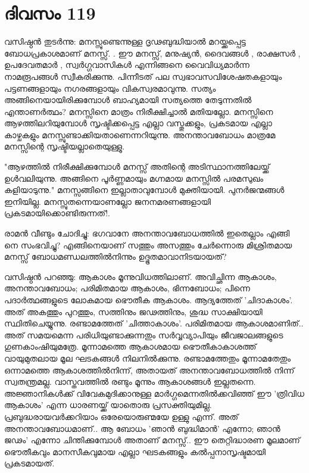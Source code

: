  
\section{ദിവസം 119}


വസിഷ്ഠന്‍ തുടര്‍ന്നു: മനസ്സുണ്ടെന്നുള്ള ദൃഢബുദ്ധിയാല്‍ മറയ്ക്കപ്പെട്ട ബോധപ്രകാശമാണ്‌ മനസ്സ്‌. . ഈ മനസ്സ്‌, മനുഷ്യന്‍, ദൈവങ്ങള്‍ , രാക്ഷസര്‍ , ഉപദേവതമാര്‍ , സ്വര്‍ഗ്ഗവാസികള്‍ എന്നിങ്ങനെ വൈവിധ്യമാര്‍ന്ന നാമരൂപങ്ങള്‍ സ്വീകരിക്കുന്നു. പിന്നീടത്‌ പല സ്വഭാവസവിശേഷതകളായും പട്ടണങ്ങളായും നഗരങ്ങളായും വികസ്വരമാവുന്നു. സത്യം അങ്ങിനെയായിരിക്കുമ്പോള്‍ ബാഹ്യമായി സത്യത്തെ തേടുന്നതില്‍ എന്താണര്‍ത്ഥം? മനസ്സിനെ മാത്രം നിരീക്ഷിച്ചാല്‍ മതിയല്ലോ. മനസ്സിനെ ആഴത്തിലറിയുമ്പോള്‍ സൃഷ്ടിക്കപ്പെട്ട എല്ലാ വസ്തുക്കളും, പ്രകടമായ എല്ലാ കാഴ്ചകളും മനസ്സുണ്ടാക്കിയതാണെന്നറിയുന്നു. അനന്താവബോധം മാത്രമേ മനസ്സിന്റെ സൃഷ്ടിയല്ലാതെയുള്ളു.

"ആഴത്തില്‍ നിരീക്ഷിക്കുമ്പോള്‍ മനസ്സ്‌ അതിന്റെ അടിസ്ഥാനത്തിലേയ്ക്ക്‌ ഉള്‍വലിയുന്നു. അങ്ങിനെ പൂര്‍ണ്ണമായും മഗ്നമായ മനസ്സില്‍ പരമസുഖം കളിയാടുന്നു." മനസ്സങ്ങിനെ ഇല്ലാതാവുമ്പോള്‍ മുക്തിയായി. പുനര്‍ജന്മങ്ങള്‍ ഇനിയില്ല. മനസ്സുതന്നെയാണല്ലോ ജനനമരണങ്ങളായി പ്രകടമായിക്കൊണ്ടിരുന്നത്‌!.

രാമന്‍ വീണ്ടും ചോദിച്ചു: ഭഗവാനേ അനന്താവബോധത്തില്‍ ഇതെല്ലാം എങ്ങി നെ സംഭവിച്ചു? എങ്ങിനെയാണ്‌ സത്തും അസത്തും ചേര്‍ന്നൊരു മിശ്രിതമായ മനസ്സ്‌ ബോധമണ്ഡലത്തില്‍നിന്നും ഉദ്ഭൂതമാവാനിടയായത്‌?

വസിഷ്ഠന്‍ പറഞ്ഞു: ആകാശം മൂന്നുവിധത്തിലാണ്‌. അവിച്ഛിന്ന ആകാശം, അനന്താവബോധം; പരിമിതമായ ആകാശം, ഭിന്നബോധം; പിന്നെ പദാര്‍ത്ഥങ്ങളുടെ ലോകമായ ഭൌതീക ആകാശം. ആദ്യത്തേത്‌ 'ചിദാകാശം'. അത്‌ അകത്തും പുറത്തും, സത്തിനും ജഢത്തിനും, ശുദ്ധ സാക്ഷിയായി സ്ഥിതിചെയ്യുന്നു. രണ്ടാമത്തേത്‌ 'ചിത്താകാശം'. പരിമിതമായ ആകാശമാണിത്‌.. അത്‌ സമയമെന്ന പരിധിയുണ്ടാക്കുന്നതും സര്‍വ്വവ്യാപിയും ജീവജാലങ്ങളുടെ ഗുണകാംഷിയുമത്രേ. മൂന്നാമത്തെ ആകാശമായ ഭൌതീകാകാശത്ത്‌ വായുമുതലായ മൂല ഘടകങ്ങള്‍ നിലനില്‍ക്കുന്നു. രണ്ടാമത്തേതും മൂന്നാമതേതും ഒന്നാമത്തെ ആകാശത്തില്‍നിന്ന്, അതായത് അനന്താവബോധത്തില്‍ നിന്ന് സ്വതന്ത്രമല്ല. വാസ്തവത്തില്‍ രണ്ടും മൂന്നും ആകാശങ്ങള്‍ ഇല്ലതന്നെ. അജ്ഞാനികള്‍ക്ക്‌ വിവേകമുദിക്കാനുള്ള മാര്‍ഗ്ഗമെന്നതില്‍ക്കവിഞ്ഞ്‌ ഈ 'ത്രിവിധ ആകാശം' എന്ന ധാരണയ്ക്ക്‌ യാതൊരു പ്രസക്തിയുമില്ല. പ്രബുദ്ധരായവര്‍ക്കറിയാം ഒരേയൊരുണ്മയേ ഉള്ളു എന്ന്. അത്‌ അനന്താവബോധമാണ്‌.. ആ ബോധം 'ഞാന്‍ ബുദ്ധിമാന്‍' എന്നോ; ഞാന്‍ ജഢം' എന്നോ ചിന്തിക്കുമ്പോള്‍ അതാണ്‌ മനസ്സ്‌.. ഈ തെറ്റിദ്ധാരണ മൂലമാണ് ഭൌതീകവും മാനസീകവുമായ എല്ലാ ഘടകങ്ങളും കല്‍പ്പനാസൃഷ്ടമായി പ്രകടമായത്‌.

